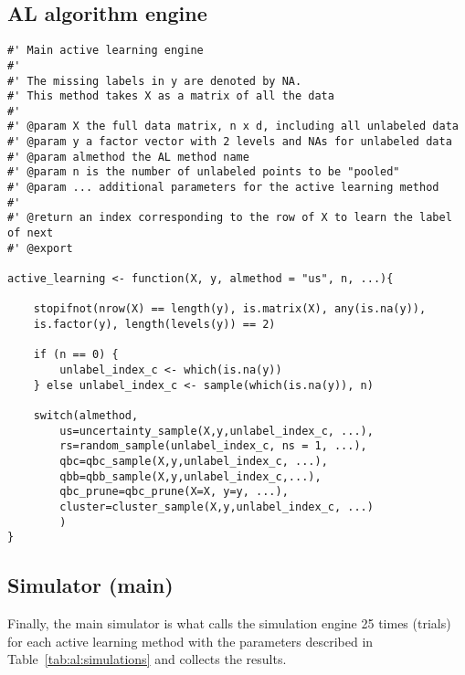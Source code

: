 \subsection{AL algorithm engine}
\label{sec:appendicies:al:simulations:alengine}
{
\begin{lstlisting}
#' Main active learning engine
#'
#' The missing labels in y are denoted by NA.
#' This method takes X as a matrix of all the data
#'
#' @param X the full data matrix, n x d, including all unlabeled data
#' @param y a factor vector with 2 levels and NAs for unlabeled data
#' @param almethod the AL method name
#' @param n is the number of unlabeled points to be "pooled"
#' @param ... additional parameters for the active learning method
#'
#' @return an index corresponding to the row of X to learn the label of next
#' @export

active_learning <- function(X, y, almethod = "us", n, ...){

	stopifnot(nrow(X) == length(y), is.matrix(X), any(is.na(y)),
	is.factor(y), length(levels(y)) == 2)
	
	if (n == 0) {
		unlabel_index_c <- which(is.na(y))
	} else unlabel_index_c <- sample(which(is.na(y)), n)
	
	switch(almethod,
		us=uncertainty_sample(X,y,unlabel_index_c, ...),
		rs=random_sample(unlabel_index_c, ns = 1, ...),
		qbc=qbc_sample(X,y,unlabel_index_c, ...),
		qbb=qbb_sample(X,y,unlabel_index_c,...),
		qbc_prune=qbc_prune(X=X, y=y, ...),
		cluster=cluster_sample(X,y,unlabel_index_c, ...)
		)
}
\end{lstlisting}
}

\subsection{Simulator (main)}
\label{sec:appendicies:al:simulations:results}

Finally, the main simulator is what calls the simulation engine 25 times 
(trials) for each active learning method with the parameters described in 
Table~\ref{tab:al:simulations} and collects the results.

